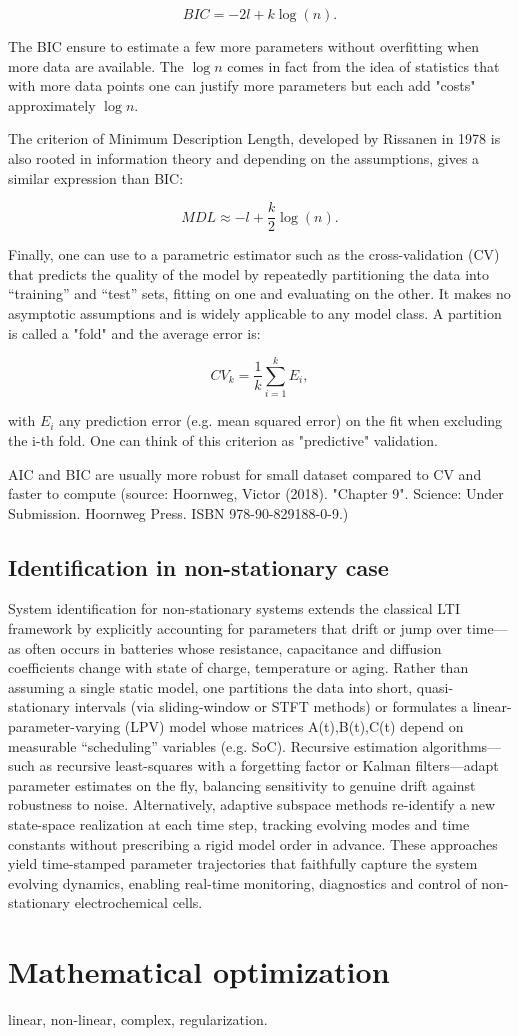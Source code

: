 $$
BIC = -2l + k \log(n).
$$

The BIC ensure to estimate a few more parameters without overfitting when more data are available. The $\log n$ comes in fact from the idea of statistics that with more data points one can justify more parameters but each add "costs" approximately $\log n$.

The criterion of Minimum Description Length, developed by Rissanen in 1978 is also rooted in information theory and depending on the assumptions, gives a similar expression than BIC:

$$
MDL \approx -l + \frac{k}{2} \log(n).
$$

Finally, one can use to a parametric estimator such as the cross-validation (CV) that predicts the quality of the model by repeatedly partitioning the data into “training” and “test” sets, fitting on one and evaluating on the other. It makes no asymptotic assumptions and is widely applicable to any model class. A partition is called a "fold" and the average error is:

$$
CV_k = \frac{1}{k}\sum_{i=1} ^k E _i,
$$

with $E_i$ any prediction error (e.g. mean squared error) on the fit when excluding the i-th fold. One can think of this criterion as "predictive" validation.

AIC and BIC are usually more robust for small dataset compared to CV and faster to compute (source: Hoornweg, Victor (2018). "Chapter 9". Science: Under Submission. Hoornweg Press. ISBN 978-90-829188-0-9.)

\subsection{Identification in non-stationary case}

System identification for non-stationary systems extends the classical LTI framework by explicitly accounting for parameters that drift or jump over time—as often occurs in batteries whose resistance, capacitance and diffusion coefficients change with state of charge, temperature or aging. Rather than assuming a single static model, one partitions the data into short, quasi-stationary intervals (via sliding-window or STFT methods) or formulates a linear-parameter-varying (LPV) model whose matrices A(t),B(t),C(t) depend on measurable “scheduling” variables (e.g. SoC). Recursive estimation algorithms—such as recursive least-squares with a forgetting factor or Kalman filters—adapt parameter estimates on the fly, balancing sensitivity to genuine drift against robustness to noise. Alternatively, adaptive subspace methods re-identify a new state-space realization at each time step, tracking evolving modes and time constants without prescribing a rigid model order in advance. These approaches yield time-stamped parameter trajectories that faithfully capture the system evolving dynamics, enabling real-time monitoring, diagnostics and control of non-stationary electrochemical cells.

\section{Mathematical optimization}

linear, non-linear, complex, regularization.